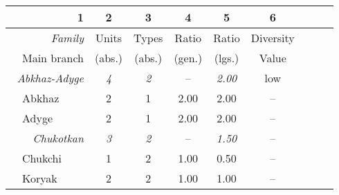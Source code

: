 \begin{footnotesize}
\begin{longtable}[h]{l l l || c || c | c | c || c c c | c}
\hline
\hline
\multicolumn{3}{r||}{1}			&2		&3		&4		&5		&6\\
\hline
\multicolumn{3}{r||}{\textit{Family}}	&Units	&Types	&Ratio	&Ratio	&Diversity\\
&\multicolumn{2}{l||}{Main branch}	&(abs.)	&(abs.)	&(gen.)	&(lgs.)	&Value\\
\hline
\multicolumn{3}{r||}{\textit{Abkhaz-Adyge}}&\textit{4}&\textit{2}&–&\textit{2.00}	&low\\
&\multicolumn{2}{l||}{Abkhaz}		&2		&1		&2.00	&2.00	&–\\
&\multicolumn{2}{l||}{Adyge}		&2		&1		&2.00	&2.00	&–\\
\hline
\multicolumn{3}{r||}{\textit{Chukotkan}}&\textit{3}&\textit{2}&–&\textit{1.50}		&–\\
&\multicolumn{2}{l||}{Chukchi}		&1		&2		&1.00	&0.50	&–\\
&\multicolumn{2}{l||}{Koryak}		&2		&2		&1.00	&1.00	&–\\
\hline


\end{longtable}
\end{footnotesize}
